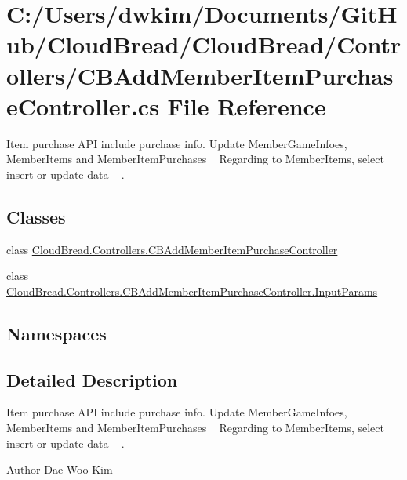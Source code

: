 \hypertarget{a00198}{}\section{C\+:/\+Users/dwkim/\+Documents/\+Git\+Hub/\+Cloud\+Bread/\+Cloud\+Bread/\+Controllers/\+C\+B\+Add\+Member\+Item\+Purchase\+Controller.cs File Reference}
\label{a00198}


Item purchase A\+PI include purchase info. Update Member\+Game\+Infoes, Member\+Items and Member\+Item\+Purchases ~\newline
Regarding to Member\+Items, select insert or update data ~\newline
.  


\subsection*{Classes}
\begin{DoxyCompactItemize}
\item 
class \hyperlink{a00023}{Cloud\+Bread.\+Controllers.\+C\+B\+Add\+Member\+Item\+Purchase\+Controller}
\item 
class \hyperlink{a00124}{Cloud\+Bread.\+Controllers.\+C\+B\+Add\+Member\+Item\+Purchase\+Controller.\+Input\+Params}
\end{DoxyCompactItemize}
\subsection*{Namespaces}
\begin{DoxyCompactItemize}
\end{DoxyCompactItemize}


\subsection{Detailed Description}
Item purchase A\+PI include purchase info. Update Member\+Game\+Infoes, Member\+Items and Member\+Item\+Purchases ~\newline
Regarding to Member\+Items, select insert or update data ~\newline
. 

\begin{DoxyAuthor}{Author}
Dae Woo Kim 
\end{DoxyAuthor}

